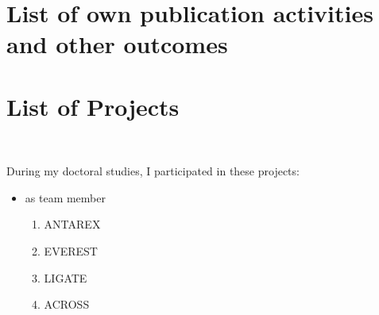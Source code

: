 \chapter*{List of own publication activities and other outcomes}
\label{ch:listofstudentsownpublicationactivitiesandotheroutcomes}

\begin{refsection}
\nocite{bohm_runtime_2020, di_girolamo_network-accelerated_2019, di_girolamo_risc-v_2021}
\printbibliography[heading=subbibintoc, title={Publications Related to Thesis}]
\end{refsection}

\begin{refsection}
\nocite{besta_graphminesuite_2021, besta_sisa_2021, bohm_haydi_2018, golasowski_alternative_2020,
martinovic_distributed_2020}
\printbibliography[heading=subbibintoc, title={Publications Not Related to Thesis}]
\end{refsection}

\chapter*{List of Projects}
\label{ch:listofprojects}~
During my doctoral studies, I participated in these projects:
\begin{itemize}
	\item as team member
		\begin{enumerate}
			\item ANTAREX
			\item EVEREST
			\item LIGATE
			\item ACROSS
		\end{enumerate}
\end{itemize}
